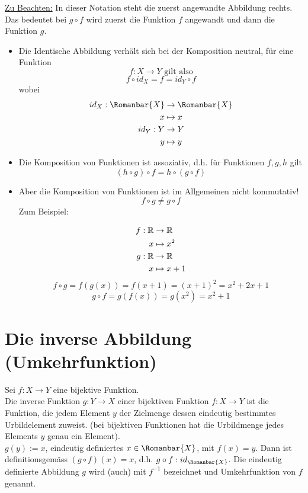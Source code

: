 \underline{Zu Beachten:}
In dieser Notation steht die zuerst angewandte Abbildung rechts. Das bedeutet bei $g\circ f$ wird zuerst die Funktion $f$ angewandt und dann die Funktion $g$. 
\begin{itemize}
\item Die Identische Abbildung verhält sich bei der Komposition neutral, für eine Funktion \[f:X\to Y \text{ gilt also}\]
\[f\circ id_X=f=id_Y \circ f\] wobei
\begin{align*}
id_X:\Romanbar{X}&\to\Romanbar{X} \\
x&\mapsto x \\
id_Y :Y&\to Y \\ 
y&\mapsto y
\end{align*}

\item Die Komposition von Funktionen ist assoziativ, d.h. für Funktionen $f,g,h$ gilt \[\left( h\circ g\right)\circ f=h\circ \left( g\circ f\right)\]
\item Aber die Komposition von Funktionen ist im Allgemeinen nicht kommutativ! \[f\circ g\not= g\circ f\]
Zum Beispiel:

\begin{align*}
f:\mathbb{R} &\to\mathbb{R} \\
x &\mapsto x^2 \\
g:\mathbb{R}&\to\mathbb{R} \\
x &\mapsto x+1
\end{align*}
\[f\circ g=f\left( g(x)\right)=f(x+1)=(x+1)^2=x^2+2x+1 \]
\[g\circ f=g\left( f(x)\right)=g(x^2)=x^2+1\]
\end{itemize}

\section{Die inverse Abbildung (Umkehrfunktion)}
Sei $f:X\to Y$ eine bijektive Funktion. \\


Die inverse Funktion $g:Y\to X$ einer bijektiven Funktion $f:X\to Y$ ist die Funktion, die jedem Element $y$ der Zielmenge dessen eindeutig bestimmtes Urbildelement zuweist. (bei bijektiven Funktionen hat die Urbildmenge jedes Elements $y$ genau ein Element). \\

 $g(y):=x$, eindeutig definiertes $ x\in\Romanbar{X}$, mit $f(x)=y$. Dann ist definitionsgemäss $(g\circ f)(x)=x$, d.h. $g\circ f:id_{\Romanbar{X}}$. Die eindeutig definierte Abbildung $g$ wird (auch) mit $f^{-1}$ bezeichnet und Umkehrfunktion von $f$ genannt.\\

